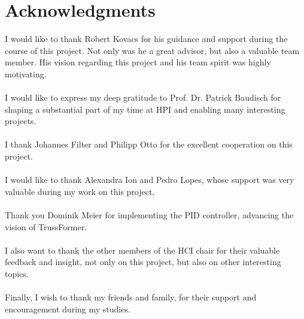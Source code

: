 
\begingroup
\let\clearpage\relax
\let\cleardoublepage\relax
\let\cleardoublepage\relax
\chapter*{Acknowledgments}
I would like to thank Robert Kovacs for his guidance and support during the course of this project. Not only was he a great advisor, but also a valuable team member. His vision regarding this project and his team spirit was highly motivating.\\
\\
I  would like to express my deep gratitude to Prof. Dr. Patrick Baudisch for shaping a substantial part of my time at HPI and enabling many interesting projects.\\
\\
I thank Johannes Filter and Philipp Otto for the excellent cooperation on this project.\\
\\
I would like to thank Alexandra Ion and Pedro Lopes, whose support was very valuable during my work on this project.\\
\\
Thank you Dominik Meier for implementing the PID controller, advancing the vision of TrussFormer.\\
\\
I also want to thank the other members of the HCI chair for their valuable feedback and insight, not only on this project, but also on other interesting topics.\\
\\
Finally, I wish to thank my friends and family, for their support and encouragement during my studies.


\endgroup
